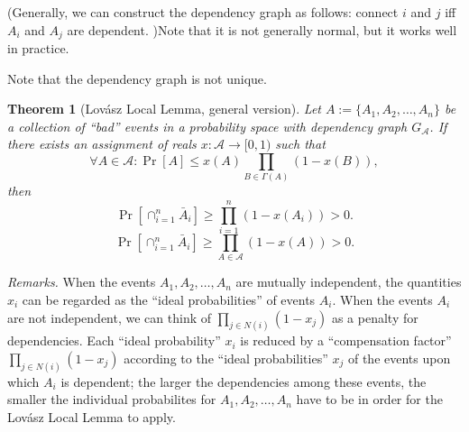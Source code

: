\documentclass[twoside]{article}
\newcounter{lecnum}
\newtheorem{theorem}{Theorem}[lecnum]
\begin{document}
(Generally, we can construct the dependency graph as follows: connect $i$ and $j$ iff $A_i$ and $A_j$ are dependent. )Note that it is not generally normal, but it works well in practice.

Note that the dependency graph is not unique.

\begin{theorem}[Lov\'{a}sz Local Lemma, general version] Let $A:=\{A_1,A_2,\dots,A_n\}$ be a collection of ``bad'' events in a probability space with dependency graph $G_{\mathcal{A}}$. If there exists an assignment of reals $x:\mathcal{A}\rightarrow [0,1)$ such that 
$$\forall A\in \mathcal{A}:\Pr[A]\leq x(A)\prod\limits_{B\in \Gamma(A)}(1-x(B)),$$
then
$$\Pr[\cap_{i=1}^{n}\bar{A}_i]\geq\prod_{i=1}^{n}(1-x(A_i))>0.$$
$$\Pr[\cap_{i=1}^{n}\bar{A}_i]\geq\prod_{A\in\mathcal{A}}(1-x(A))>0.$$
\end{theorem}

\emph{Remarks.}
When the events $A_1,A_2,\dots,A_n$ are mutually independent, the quantities $x_i$ can be regarded as the ``ideal probabilities'' of events $A_i$. When the events $A_i$ are not independent, we can think of $\prod_{j\in N(i)}(1-x_j)$ as a penalty for dependencies. Each ``ideal probability'' $x_i$ is reduced by a ``compensation factor'' $\prod_{j\in N(i)}(1-x_j)$ according to the ``ideal probabilities'' $x_j$ of the events upon which $A_i$ is dependent; the larger the dependencies among these events, the smaller the individual probabilites for $A_1,A_2,\dots,A_n$ have to be in order for the Lov\'{a}sz Local Lemma to apply.
\end{document}
